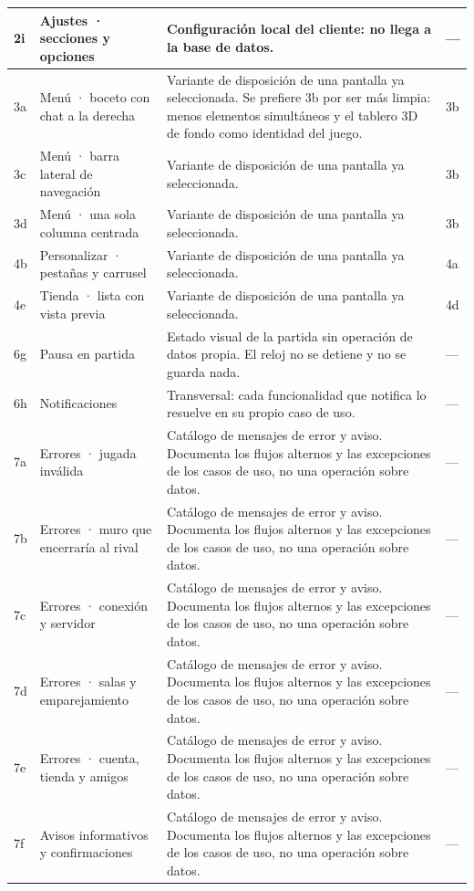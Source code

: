 \begin{center}
\begin{longtable}{|L{0.115\textwidth}|L{0.25\textwidth}|L{0.41\textwidth}|L{0.115\textwidth}|}
2i & Ajustes · secciones y opciones & Configuración local del cliente: no llega a la base de datos. & — \\ \hline
3a & Menú · boceto con chat a la derecha & Variante de disposición de una pantalla ya seleccionada. Se prefiere 3b por ser más limpia: menos elementos simultáneos y el tablero 3D de fondo como identidad del juego. & 3b \\ \hline
3c & Menú · barra lateral de navegación & Variante de disposición de una pantalla ya seleccionada. & 3b \\ \hline
3d & Menú · una sola columna centrada & Variante de disposición de una pantalla ya seleccionada. & 3b \\ \hline
4b & Personalizar · pestañas y carrusel & Variante de disposición de una pantalla ya seleccionada. & 4a \\ \hline
4e & Tienda · lista con vista previa & Variante de disposición de una pantalla ya seleccionada. & 4d \\ \hline
6g & Pausa en partida & Estado visual de la partida sin operación de datos propia. El reloj no se detiene y no se guarda nada. & — \\ \hline
6h & Notificaciones & Transversal: cada funcionalidad que notifica lo resuelve en su propio caso de uso. & — \\ \hline
7a & Errores · jugada inválida & Catálogo de mensajes de error y aviso. Documenta los flujos alternos y las excepciones de los casos de uso, no una operación sobre datos. & — \\ \hline
7b & Errores · muro que encerraría al rival & Catálogo de mensajes de error y aviso. Documenta los flujos alternos y las excepciones de los casos de uso, no una operación sobre datos. & — \\ \hline
7c & Errores · conexión y servidor & Catálogo de mensajes de error y aviso. Documenta los flujos alternos y las excepciones de los casos de uso, no una operación sobre datos. & — \\ \hline
7d & Errores · salas y emparejamiento & Catálogo de mensajes de error y aviso. Documenta los flujos alternos y las excepciones de los casos de uso, no una operación sobre datos. & — \\ \hline
7e & Errores · cuenta, tienda y amigos & Catálogo de mensajes de error y aviso. Documenta los flujos alternos y las excepciones de los casos de uso, no una operación sobre datos. & — \\ \hline
7f & Avisos informativos y confirmaciones & Catálogo de mensajes de error y aviso. Documenta los flujos alternos y las excepciones de los casos de uso, no una operación sobre datos. & — \\ \hline

\end{longtable}
\end{center}
